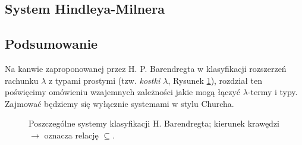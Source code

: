 
\subsection{System Hindleya-Milnera}
\subsection{Podsumowanie}
Na kanwie zaproponowanej przez H. P. Barendregta w \cite[Rozdział 5]{Barendregt_1992} klasyfikacji rozszerzeń rachunku \(\lambda\) z typami prostymi (tzw. \emph{kostki \(\lambda\)}, Rysunek \ref{fig:lambda-cube}), rozdział ten poświęcimy omówieniu wzajemnych zależności jakie mogą łączyć \(\lambda\)-termy i typy. Zajmować będziemy się wyłącznie systemami w stylu Churcha.

\begin{figure}[!h]
  \centering
  \caption{Poszczególne systemy klasyfikacji H. Barendregta; kierunek krawędzi \(\to\)  oznacza relację \(\subseteq\).}\label{fig:lambda-cube}
\end{figure}


